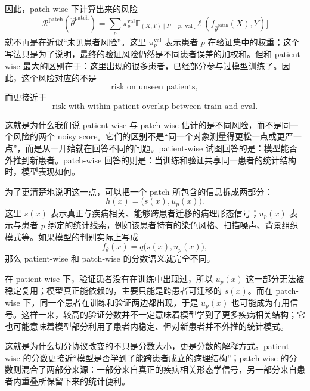 因此，patch-wise 下计算出来的风险
\begin{equation}
    \mathcal{R}^{\mathrm{patch}}(\hat{\theta}^{\mathrm{patch}})
    =
    \sum_{p}
    \pi_p^{\mathrm{val}}
    \mathbb{E}_{(X,Y)\mid P=p,\ \mathrm{val}}
    \bigl[
        \ell(f_{\hat{\theta}^{\mathrm{patch}}}(X),Y)
        \bigr]
\end{equation}
就不再是在近似“未见患者风险”。这里 $\pi_p^{\mathrm{val}}$ 表示患者 $p$ 在验证集中的权重；这个写法只是为了说明，最终的验证风险仍然是不同患者误差的加权和。但和 patient-wise 最大的区别在于：这里出现的很多患者，已经部分参与过模型训练了。因此，这个风险对应的不是
\begin{equation}
    \text{risk on unseen patients},
\end{equation}
而更接近于
\begin{equation}
    \text{risk with within-patient overlap between train and eval}.
\end{equation}

这就是为什么我们说 patient-wise 与 patch-wise 估计的是不同风险，而不是同一个风险的两个 noisy score。它们的区别不是“同一个对象测量得更松一点或更严一点”，而是从一开始就在回答不同的问题。patient-wise 试图回答的是：模型能否外推到新患者。patch-wise 回答的则是：当训练和验证共享同一患者的统计结构时，模型表现如何。

为了更清楚地说明这一点，可以把一个 patch 所包含的信息拆成两部分：
\begin{equation}
    h(x) = \bigl(s(x), u_p(x)\bigr).
\end{equation}
这里 $s(x)$ 表示真正与疾病相关、能够跨患者迁移的病理形态信号；$u_p(x)$ 表示与患者 $p$ 绑定的统计线索，例如该患者特有的染色风格、扫描噪声、背景组织模式等。如果模型的判别实际上写成
\begin{equation}
    f_{\theta}(x) = q\bigl(s(x),u_p(x)\bigr),
\end{equation}
那么 patient-wise 和 patch-wise 的分数语义就完全不同。

在 patient-wise 下，验证患者没有在训练中出现过，所以 $u_p(x)$ 这一部分无法被稳定复用；模型真正能依赖的，主要只能是跨患者可迁移的 $s(x)$。而在 patch-wise 下，同一个患者在训练和验证两边都出现，于是 $u_p(x)$ 也可能成为有用信号。这样一来，较高的验证分数并不一定意味着模型学到了更多疾病相关结构；它也可能意味着模型部分利用了患者内稳定、但对新患者并不外推的统计模式。

这就是为什么切分协议改变的不只是分数大小，更是分数的解释方式。patient-wise 的分数更接近“模型是否学到了能跨患者成立的病理结构”；patch-wise 的分数则混合了两部分来源：一部分来自真正的疾病相关形态学信号，另一部分来自患者内重叠所保留下来的统计便利。
